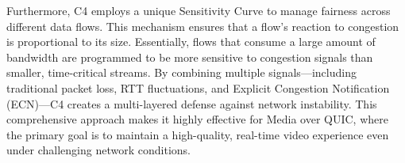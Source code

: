 Furthermore, C4 employs a unique Sensitivity Curve to manage fairness across different data flows\cite{C4}. 
This mechanism ensures that a flow's reaction to congestion is proportional to its size.
Essentially, flows that consume a large amount of bandwidth are programmed to be more sensitive to congestion signals than smaller, time-critical streams. 
By combining multiple signals—including traditional packet loss, RTT fluctuations, and Explicit Congestion Notification (ECN)—C4 creates a multi-layered defense against network instability. 
This comprehensive approach makes it highly effective for Media over QUIC, where the primary goal is to maintain a high-quality, real-time video experience even under challenging network conditions.

